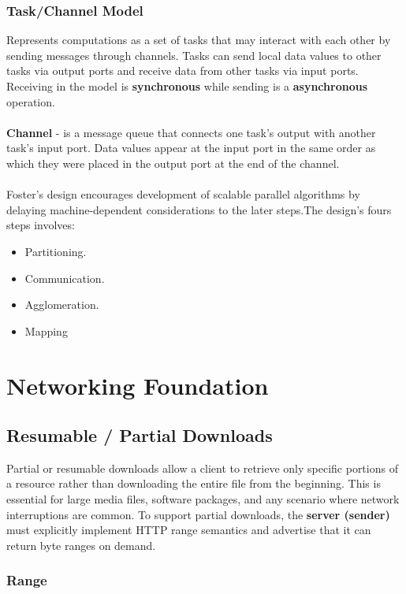 \documentclass[11pt,a4paper]{article}
\begin{document}
	\subsubsection{Task/Channel Model}
	Represents computations as a set of tasks that may interact with each other by sending messages through channels. Tasks can send local data values to other tasks via output ports and receive data from other tasks via input ports.
	Receiving in the model is \textbf{synchronous} while sending is a \textbf{asynchronous} operation.\\
	\\\textbf{Channel} - is a message queue that connects one task's output with another task's input port. Data values appear at the input port in the same order as which they were placed in the output port at the end of the channel.\\
	\\Foster's design encourages development of scalable parallel algorithms by delaying machine-dependent considerations to the later steps.The design's fours steps involves:
	\begin{itemize}
		\item Partitioning.
		\item Communication.
		\item Agglomeration.
		\item Mapping
	\end{itemize}
	
	\newpage
	\section{Networking Foundation}
	\label{sec:background}
	\subsection{Resumable / Partial Downloads}
	
	Partial or resumable downloads allow a client to retrieve only specific portions of a resource rather than downloading the entire file from the beginning. This is essential for large media files, software packages, and any scenario where network interruptions are common.  
	To support partial downloads, the \textbf{server (sender)} must explicitly implement HTTP range semantics and advertise that it can return byte ranges on demand.
	
	\subsubsection{Range}
	
\end{document}
